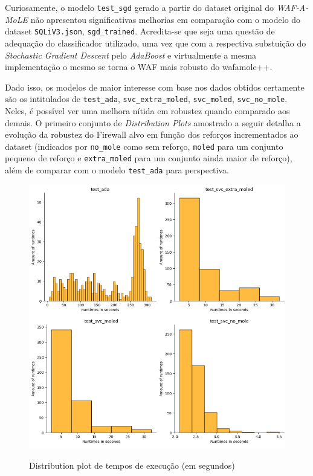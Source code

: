 Curiosamente, o modelo \verb+test_sgd+ gerado a partir do dataset original do \textit{WAF-A-MoLE} não apresentou significativas melhorias em comparação com o modelo do dataset \verb+SQLiV3.json+, \verb+sgd_trained+. Acredita-se que seja uma questão de adequação do classificador utilizado, uma vez que com a respectiva substuição do \textit{Stochastic Gradient Descent} pelo \textit{AdaBoost} e virtualmente a mesma implementação o mesmo se torna o WAF mais robusto do wafamole++.

Dado isso, os modelos de maior interesse com base nos dados obtidos certamente são os intitulados de \verb+test_ada+, \verb+svc_extra_moled+, \verb+svc_moled+, \verb+svc_no_mole+. Neles, é possível ver uma melhora nítida em robustez quando comparado aos demais. O primeiro conjunto de \textit{Distribution Plots} amostrado a seguir detalha a evolução da robustez do Firewall alvo em função dos reforços incrementados ao dataset (indicados por \verb+no_mole+ como sem reforço, \verb+moled+ para um conjunto pequeno de reforço e \verb+extra_moled+ para um conjunto ainda maior de reforço), além de comparar com o modelo \verb+test_ada+ para perspectiva. 

\begin{figure}[ht]
    \centering
    \caption{Distribution plot de tempos de execução (em segundos)}
    \includegraphics[width=18cm]{figuras/graficos/runtimes_amount_set1.png} 
    \label{fig:mole-evolution} 
\end{figure}

